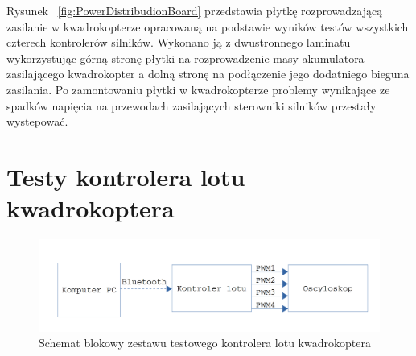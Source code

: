 Rysunek ~\ref{fig:PowerDistribudionBoard} przedstawia płytkę rozprowadzającą zasilanie w kwadrokopterze opracowaną na podstawie wyników testów wszystkich czterech kontrolerów silników. Wykonano ją z dwustronnego laminatu wykorzystując górną stronę płytki na rozprowadzenie masy akumulatora zasilającego kwadrokopter a dolną stronę na podłączenie jego dodatniego bieguna zasilania. Po zamontowaniu płytki w kwadrokopterze problemy wynikające ze spadków napięcia na przewodach zasilających sterowniki silników przestały wystepować.

\section{Testy kontrolera lotu kwadrokoptera}

\begin{figure}[H]
	\centering
	\includegraphics[scale=0.2]{Pictures/QuadrotorController_test.png}
	\caption[Schemat blokowy zestawu testowego kontrolera lotu kwadrokoptera]{Schemat blokowy zestawu testowego kontrolera lotu kwadrokoptera}
	\label{fig:QuadrotorController_test}
\end{figure}

